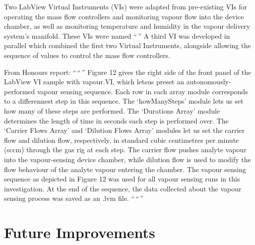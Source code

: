 \documentclass[
  a4paper,
]{scrbook}
\begin{document}
Two LabView Virtual Instruments (VIs) were adapted from pre-existing VIs
for operating the mass flow controllers and monitoring vapour flow into
the device chamber, as well as monitoring temperature and humidity in
the vapour delivery system's manifold. These VIs were named ``\,'' A
third VI was developed in parallel which combined the first two Virtual
Instruments, alongside allowing the sequence of values to control the
mass flow controllers.

From Honours report: ``\,``\,'' Figure 12 gives the right side of the
front panel of the LabView VI sample with vapour.VI, which letsus preset
an autonomously-performed vapour sensing sequence. Each row in each
array module corresponds to a differennest step in this sequence. The
`howManySteps' module lets us set how many of these steps are performed.
The `Durations Array' module determines the length of time in seconds
each step is performed over. The `Carrier Flows Array' and `Dilution
Flows Array' modules let us set the carrier flow and dilution flow,
respectively, in standard cubic centimetres per minute (sccm) through
the gas rig at each step. The carrier flow pushes analyte vapour into
the vapour-sensing device chamber, while dilution flow is used to modify
the flow behaviour of the analyte vapour entering the chamber. The
vapour sensing sequence as depicted in Figure 12 was used for all vapour
sensing runs in this investigation. At the end of the sequence, the data
collected about the vapour sensing process was saved as an .lvm file.
``\,``\,''

\hypertarget{future-improvements}{%
\section{Future Improvements}\label{future-improvements}}


\backmatter
\printbibliography
\end{document}
